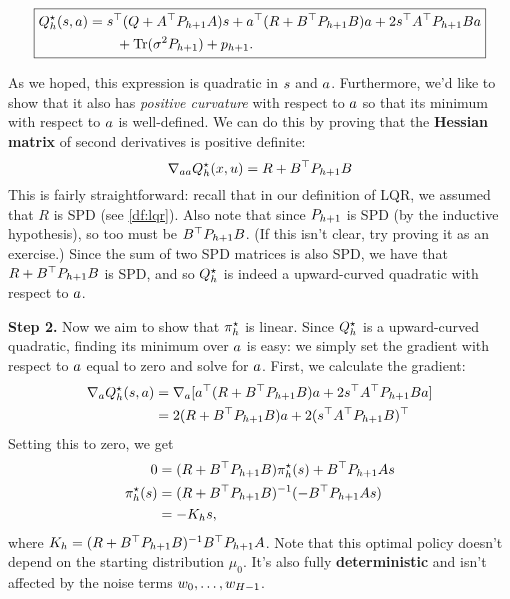 \documentclass[\main/main]{subfiles}
\begin{document}
\begin{equation}
    \boxed{
        \begin{aligned}
            Q^\star_h(s, a) & = s^\top (Q + A^\top P_{h+1} A) s + a^\top (R + B^\top P_{h+1} B) a
            + 2s^\top A^\top P_{h+1} B a                                                                        \\
                                   & \qquad + \operatorname*{\textrm{Tr}}(\sigma^2 P_{h+1}) + p_{h+1}.
        \end{aligned}
    }
    \label{eq:q_star_lqr}
\end{equation}

As we hoped, this expression is quadratic in $s$ and $a$.
Furthermore, we'd like to show that it also has \emph{positive curvature} with respect to $a$ so that its minimum with respect to $a$ is well-defined.
We can do this by proving that the \textbf{Hessian matrix} of second derivatives is positive definite:
\[ \nabla_{a a} Q_h^\star(x, u) = R + B^\top P_{h+1} B \]
This is fairly straightforward:
recall that in our definition of LQR,
we assumed that $R$ is SPD (see \autoref{df:lqr}).
Also note that since $P_{h+1}$ is SPD (by the inductive hypothesis), so too must be $B^\top P_{h+1} B$. (If this isn't clear, try proving it as an exercise.)
Since the sum of two SPD matrices is also SPD, we have that $R + B^\top P_{h+1} B$ is SPD,
and so $Q^\star_h$ is indeed a upward-curved quadratic with respect to $a$.

\textbf{Step 2.} Now we aim to show that $\pi^\star_h$ is linear.
Since $Q^\star_h$ is a upward-curved quadratic, finding its minimum over $a$ is easy:
we simply set the gradient with respect to $a$ equal to zero and solve for $a$.
First, we calculate the gradient:
\begin{align*}
    \nabla_a Q^\star_h(s, a) & = \nabla_a [ a^\top (R + B^\top P_{h+1} B) a + 2 s^\top A^\top P_{h+1} B a ] \\
                                       & = 2 (R + B^\top P_{h+1} B) a + 2 (s^\top A^\top P_{h+1} B)^\top
\end{align*}
Setting this to zero, we get \begin{align}
    0                  & = (R + B^\top P_{h+1} B) \pi^\star_h(s) + B^\top P_{h+1} A s \nonumber \\
    \pi^\star_h(s) & = (R + B^\top P_{h+1} B)^{-1} (-B^\top P_{h+1} A s) \nonumber              \\
                       & = - K_h s,
\end{align}
where $K_h = (R + B^\top P_{h+1} B)^{-1} B^\top P_{h+1} A$. Note that this optimal policy doesn't depend on the starting distribution $\mu_0$. It's also fully \textbf{deterministic} and isn't affected by the noise terms $w_0, \dots, w_{H-1}$.
\end{document}
